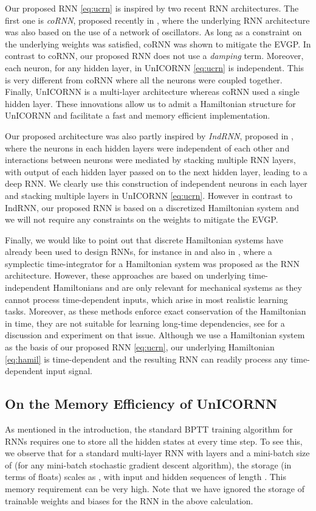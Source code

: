 \documentclass[a4paper]{article}
\begin{document}
Our proposed RNN \eqref{eq:ucrn} is inspired by two recent RNN architectures. The first one is \emph{coRNN}, proposed recently in \cite{coRNN}, where the underlying RNN architecture was also based on the use of a network of oscillators. As long as a constraint on the underlying weights was satisfied, coRNN was shown to mitigate the EVGP. In contrast to coRNN, our proposed RNN does not use a \emph{damping} term. Moreover, each neuron, for any hidden layer, in UnICORNN \eqref{eq:ucrn} is independent. This is very different from coRNN where all the neurons were coupled together. Finally, UnICORNN is a multi-layer architecture whereas coRNN used a single hidden layer. These innovations allow us to admit a Hamiltonian structure for UnICORNN and facilitate a fast and memory efficient implementation. 

Our proposed architecture was also partly inspired by \emph{IndRNN}, proposed in \cite{indrnn,deep_indrnn}, where the neurons in each hidden layers were independent of each other and interactions between neurons were mediated by stacking multiple RNN layers, with output of each hidden layer passed on to the next hidden layer, leading to a deep RNN. We clearly use this construction of independent neurons in each layer and stacking multiple layers in UnICORNN \eqref{eq:ucrn}. However in contrast to IndRNN, our proposed RNN is based on a discretized Hamiltonian system and we will not require any constraints on the weights to mitigate the EVGP.

Finally, we would like to point out that discrete Hamiltonian systems have already been used to design RNNs, for instance in \cite{hnn} and also in \cite{srnn}, where a symplectic time-integrator for a Hamiltonian system was proposed as the RNN architecture. However, these approaches are based on underlying time-independent Hamiltonians and are only relevant for mechanical systems as they cannot process time-dependent inputs, which arise in most realistic learning tasks. Moreover, as these methods enforce exact conservation of the Hamiltonian in time, they are not suitable for learning long-time dependencies, see \cite{inv_lstm} for a discussion and experiment on that issue. Although we use a Hamiltonian system as the basis of our proposed RNN \eqref{eq:ucrn}, our underlying Hamiltonian \eqref{eq:hamil} is time-dependent and the resulting RNN can readily process any time-dependent input signal. 
\subsection{On the Memory Efficiency of UnICORNN}
As mentioned in the introduction, the standard BPTT training algorithm for RNNs requires one to store all the hidden states at every time step. To see this, we observe that for a standard multi-layer RNN with  layers and a mini-batch size of  (for any mini-batch stochastic gradient descent algorithm), the storage (in terms of floats) scales as , with input and hidden sequences of length . This memory requirement can be very high. Note that we have ignored the storage of trainable weights and biases for the RNN in the above calculation.
\end{document}

